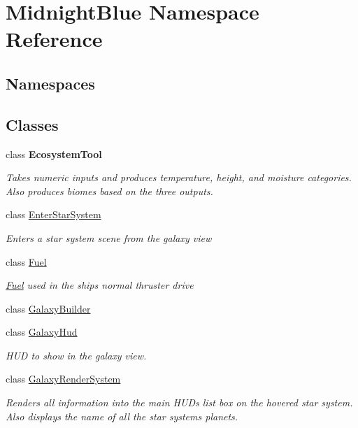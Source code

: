 \hypertarget{namespace_midnight_blue}{}\section{Midnight\+Blue Namespace Reference}
\label{namespace_midnight_blue}
\subsection*{Namespaces}
\begin{DoxyCompactItemize}
\end{DoxyCompactItemize}
\subsection*{Classes}
\begin{DoxyCompactItemize}
\item 
class {\bfseries Ecosystem\+Tool}
\begin{DoxyCompactList}\small\item\em Takes numeric inputs and produces temperature, height, and moisture categories. Also produces biomes based on the three outputs. \end{DoxyCompactList}\item 
class \hyperlink{class_midnight_blue_1_1_enter_star_system}{Enter\+Star\+System}
\begin{DoxyCompactList}\small\item\em Enters a star system scene from the galaxy view \end{DoxyCompactList}\item 
class \hyperlink{class_midnight_blue_1_1_fuel}{Fuel}
\begin{DoxyCompactList}\small\item\em \hyperlink{class_midnight_blue_1_1_fuel}{Fuel} used in the ships normal thruster drive \end{DoxyCompactList}\item 
class \hyperlink{class_midnight_blue_1_1_galaxy_builder}{Galaxy\+Builder}
\item 
class \hyperlink{class_midnight_blue_1_1_galaxy_hud}{Galaxy\+Hud}
\begin{DoxyCompactList}\small\item\em H\+UD to show in the galaxy view. \end{DoxyCompactList}\item 
class \hyperlink{class_midnight_blue_1_1_galaxy_render_system}{Galaxy\+Render\+System}
\begin{DoxyCompactList}\small\item\em Renders all information into the main H\+UD\textquotesingle{}s list box on the hovered star system. Also displays the name of all the star systems planets. \end{DoxyCompactList}\item 

\end{DoxyCompactItemize}

